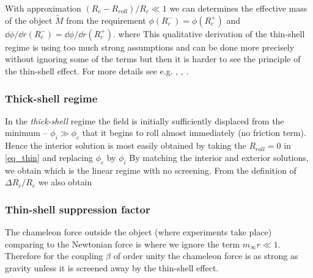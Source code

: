 With approximation $(R_c-R_{roll})/R_c\ll1$ we can determines the effective mass of the object $\tilde{M}$ from the requirement $\phi(R_c^-)=\phi(R_c^+)$ and $\dd\phi/\dd r(R_c^-)=\dd\phi/\dd r(R_c^+)$.
where
This qualitative derivation of the thin-shell regime is using too much strong assumptions and can be done more precisely without ignoring some of the terms but then it is harder to see the principle of the thin-shell effect. For more details see e.g. \textcite{Tamaki:2008mf}, \textcite{2007PhRvD..75f3501M}, \textcite{Waterhouse:2006wv}.
\subsubsection{Thick-shell regime}
In the \textit{thick-shell} regime the field is initially sufficiently displaced from the minimum -- $\phi_i\gg\phi_c$ that it begins to roll almost immediately (no friction term). Hence the interior solution is most easily obtained by taking the $R_{roll}=0$ in \eqref{eq_thin} and replacing $\phi_c$ by $\phi_i$
By matching the interior and exterior solutions, we obtain
which is the linear regime with no screening. From the definition of $\Delta R_c/R_c$ we also obtain
\subsubsection{Thin-shell suppression factor}
The chameleon force outside the object (where experiments take place) comparing to the Newtonian force is
where we ignore the term $m_\infty r\ll1$. Therefore for the coupling $\beta$ of order unity the chameleon force is as strong as gravity unless it is screened away by the thin-shell effect.
